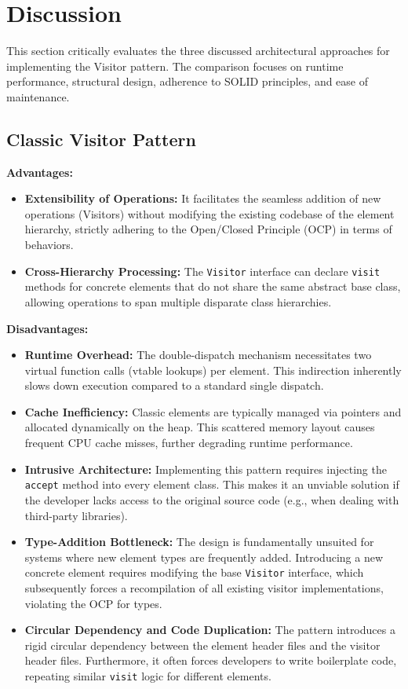 \section{Discussion}
\label{sec:discussion}

This section critically evaluates the three discussed architectural approaches for implementing the Visitor pattern. The comparison focuses on runtime performance, structural design, adherence to SOLID principles, and ease of maintenance.

\subsection{Classic Visitor Pattern}

\textbf{Advantages:}
\begin{itemize}
    \item \textbf{Extensibility of Operations:} It facilitates the seamless addition of new operations (Visitors) without modifying the existing codebase of the element hierarchy, strictly adhering to the Open/Closed Principle (OCP) in terms of behaviors.
    \item \textbf{Cross-Hierarchy Processing:} The \texttt{Visitor} interface can declare \texttt{visit} methods for concrete elements that do not share the same abstract base class, allowing operations to span multiple disparate class hierarchies.
\end{itemize}

\textbf{Disadvantages:}
\begin{itemize}
    \item \textbf{Runtime Overhead:} The double-dispatch mechanism necessitates two virtual function calls (vtable lookups) per element. This indirection inherently slows down execution compared to a standard single dispatch.
    \item \textbf{Cache Inefficiency:} Classic elements are typically managed via pointers and allocated dynamically on the heap. This scattered memory layout causes frequent CPU cache misses, further degrading runtime performance.
    \item \textbf{Intrusive Architecture:} Implementing this pattern requires injecting the \texttt{accept} method into every element class. This makes it an unviable solution if the developer lacks access to the original source code (e.g., when dealing with third-party libraries).
    \item \textbf{Type-Addition Bottleneck:} The design is fundamentally unsuited for systems where new element types are frequently added. Introducing a new concrete element requires modifying the base \texttt{Visitor} interface, which subsequently forces a recompilation of all existing visitor implementations, violating the OCP for types.
    \item \textbf{Circular Dependency and Code Duplication:} The pattern introduces a rigid circular dependency between the element header files and the visitor header files. Furthermore, it often forces developers to write boilerplate code, repeating similar \texttt{visit} logic for different elements.
\end{itemize}


